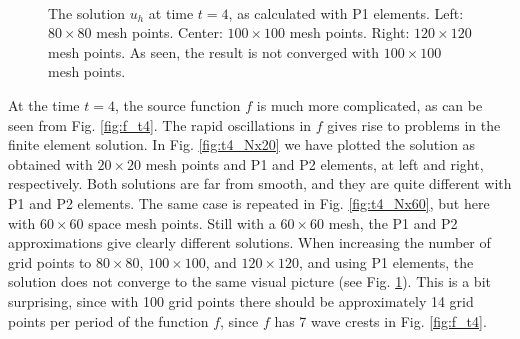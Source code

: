 \documentclass[twoside]{article}
\begin{document}
\begin{figure}
  \centering
  \mbox{
    \quad
    \quad 
  }
  \centering
  \caption{The solution $u_{h}$ at time $t = 4$, as calculated with P1 elements. Left: $80 \times 80$ mesh points. Center: $100 \times 100$ mesh points. Right: $120 \times 120$ mesh points. As seen, the result is not converged with $100 \times 100$ mesh points.} \label{fig:t4_Nx80100120}

\end{figure}

At the time $t = 4$, the source function $f$ is much more complicated, as can be seen from Fig. \ref{fig:f_t4}. The rapid oscillations in $f$ gives rise to problems in the finite element solution. In Fig. \ref{fig:t4_Nx20} we have plotted the solution as obtained with $20 \times 20$ mesh points and P1 and P2 elements, at left and right, respectively. Both solutions are far from smooth, and they are quite different with P1 and P2 elements. The same case is repeated in Fig. \ref{fig:t4_Nx60}, but here with $60 \times 60$ space mesh points. Still with a $60 \times 60$ mesh, the P1 and P2 approximations give clearly different solutions. When increasing the number of grid points to $80 \times 80$, $100 \times 100$, and $120 \times 120$, and using P1 elements, the solution does not converge to the same visual picture (see Fig. \ref{fig:t4_Nx80100120}). This is a bit surprising, since with 100 grid points there should be approximately 14 grid points per period of the function $f$, since $f$ has 7 wave crests in Fig. \ref{fig:f_t4}.    
\end{document}

